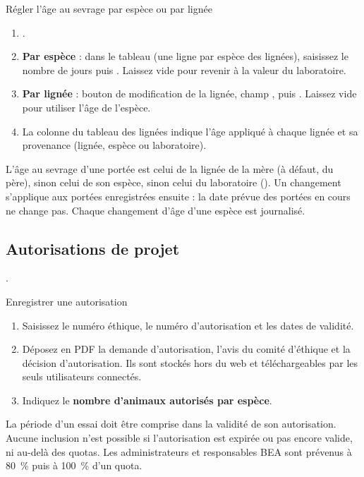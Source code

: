 \documentclass[11pt,a4paper]{article}
\begin{document}
\begin{procedure}{Régler l'âge au sevrage par espèce ou par lignée}
\begin{enumerate}
  \item {}.
  \item \textbf{Par espèce} : dans le tableau  (une ligne par espèce des lignées), saisissez le nombre de jours
    puis . Laissez vide pour revenir à la valeur du
    laboratoire.
  \item \textbf{Par lignée} : bouton de modification de la lignée, champ
    , puis . Laissez
    vide pour utiliser l'âge de l'espèce.
  \item La colonne  du tableau des lignées indique l'âge
    appliqué à chaque lignée et sa provenance (lignée, espèce ou
    laboratoire).
\end{enumerate}
\end{procedure}
\begin{regle}
L'âge au sevrage d'une portée est celui de la lignée de la mère (à défaut,
du père), sinon celui de son espèce, sinon celui du laboratoire
(). Un changement s'applique aux
portées enregistrées ensuite : la date prévue des portées en cours ne change
pas. Chaque changement d'âge d'une espèce est journalisé.
\end{regle}

\subsection{Autorisations de projet}
.
\begin{procedure}{Enregistrer une autorisation}
\begin{enumerate}
  \item Saisissez le numéro éthique, le numéro d'autorisation et les dates
    de validité.
  \item Déposez en PDF la demande d'autorisation, l'avis du comité
    d'éthique et la décision d'autorisation. Ils sont stockés hors du web et
    téléchargeables par les seuls utilisateurs connectés.
  \item Indiquez le \textbf{nombre d'animaux autorisés par espèce}.
\end{enumerate}
\end{procedure}
\begin{regle}
La période d'un essai doit être comprise dans la validité de son
autorisation. Aucune inclusion n'est possible si l'autorisation est expirée
ou pas encore valide, ni au-delà des quotas. Les administrateurs et
responsables BEA sont prévenus à 80~\% puis à 100~\% d'un quota.
\end{regle}
\end{document}
